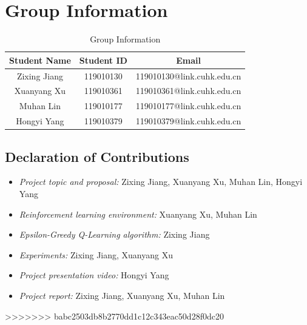 \documentclass[10pt,a4paper]{article}
\begin{document}
\section{Group Information}
\begin{table}[H]
\centering
\begin{tabular}{|c|c|c|}
\hline
\textbf{Student Name} & \textbf{Student ID} & \textbf{Email}\\ 
\hline
Zixing Jiang & 119010130 & 119010130@link.cuhk.edu.cn\\ 
\hline
Xuanyang Xu & 119010361 & 119010361@link.cuhk.edu.cn\\  
\hline
Muhan Lin & 119010177 & 119010177@link.cuhk.edu.cn\\ 
\hline
Hongyi Yang & 119010379 & 119010379@link.cuhk.edu.cn\\ 
\hline
\end{tabular}
\caption{Group Information} 
\label{tab:group}
\end{table}
\subsection*{Declaration of Contributions}
\begin{itemize}
	\item \textit{Project topic and proposal:} Zixing Jiang, Xuanyang Xu, Muhan Lin, Hongyi Yang
	\item \textit{Reinforcement learning environment:} Xuanyang Xu, Muhan Lin
	\item \textit{Epsilon-Greedy Q-Learning algorithm:} Zixing Jiang
	\item \textit{Experiments:} Zixing Jiang, Xuanyang Xu
	\item \textit{Project presentation video:} Hongyi Yang
	\item \textit{Project report:} Zixing Jiang, Xuanyang Xu, Muhan Lin
\end{itemize}
>>>>>>> babc2503db8b2770dd1c12c343eac50d28f0dc20
\end{document}
